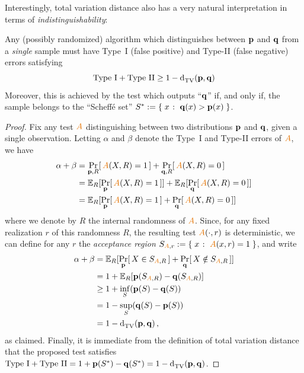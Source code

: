 Interestingly, total variation distance also has a very natural interpretation in terms of \emph{indistinguishability}:
\begin{lemma}
  \label{lemma:pearsonneyman}
  Any (possibly randomized) algorithm which distinguishes between $\mathbf{p}$ and $\mathbf{q}$ from a \emph{single} sample must have Type~I (false positive) and Type-II (false negative) errors satisfying
  \[
      \text{Type~I} + \text{Type~II} \geq 1- \totalvardist{\p}{\q}
  \]
  Moreover, this is achieved by the test which outputs ``$\mathbf{q}$'' if, and only if, the sample belongs to the ``Scheff\'e set'' $S^\ast := \left\{\; x \;\colon\; \mathbf{q}(x) > \mathbf{p}(x)\; \right\}$.
\end{lemma}
\begin{proof}
Fix any test $\Algo$ distinguishing between two distributions $\mathbf{p}$ and $\mathbf{q}$, given a single observation. Letting $\alpha$ and $\beta$ denote the Type~I and Type-II errors of $\Algo$, we have
\begin{align*}
  \alpha+\beta 
  &= \probaDistrOf{\p,R}{\Algo(X,R)=1} + \probaDistrOf{\q,R}{\Algo(X,R)=0} \\
  &= \shortexpect_{R}[ \probaDistrOf{\p}{\Algo(X,R)=1} ] + \shortexpect_{R}[ \probaDistrOf{\q}{\Algo(X,R)=0} ] \\
  &= \shortexpect_{R}[ \probaDistrOf{\p}{\Algo(X,R)=1} + \probaDistrOf{\q}{\Algo(X,R)=0} ]
\end{align*}
where we denote by $R$ the internal randomness of $\Algo$. Since, for any fixed realization $r$ of this randomness $R$, the resulting test $\Algo(\cdot,r)$ is deterministic, we can define for any $r$ the \emph{acceptance region} $S_{\Algo,r} \eqdef \setOfSuchThat{x}{\Algo(x,r)=1}$, and write
\begin{align*}
  \alpha+\beta 
  &= \shortexpect_{R}[ \probaDistrOf{\p}{X \in S_{\Algo,R}} + \probaDistrOf{\q}{X \notin S_{\Algo,R}} ] \\
  &= 1+\shortexpect_{R}[ \p(S_{\Algo,R}) - \q(S_{\Algo,R}) ] \\
  &\geq 1 + \inf_{S}(\p(S) - \q(S)) \\
  &= 1 - \sup_{S}(\q(S) - \p(S)) \\
  &= 1- \totalvardist{\p}{\q}\,,
\end{align*}
as claimed. Finally, it is immediate from the definition of total variation distance that the proposed test satisfies $\text{Type~I} + \text{Type~II} = 1 + \p(S^\ast) - \q(S^\ast) = 1- \totalvardist{\p}{\q}$.
\end{proof}
